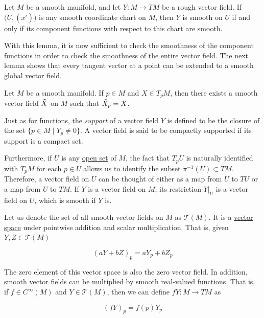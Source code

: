 \documentclass{article}
\newcounter{definition}[section]
\begin{document}
    \begin{lemma}
      \label{thm:smoothness-criterion-for-vector-fields}
      Let $M$ be a smooth manifold, and let $Y: M \to TM$ be a rough vector field. If $\big( U, (x^i)\big)$ is any smooth coordinate chart on $M$, then $Y$ is smooth on $U$ if and only if its component functions with respect to this chart are smooth. 
    \end{lemma}

    With this lemma, it is now sufficient to check the smoothness of the component functions in order to check the smoothness of the entire vector field. The next lemma shows that every tangent vector at a point can be extended to a smooth global vector field. 

    \begin{lemma}
      \label{thm:extending-a-tangent-vector-to-a-global-vector}
      Let $M$ be a smooth manifold. If $p \in M$ and $X \in T_p M$, then there exists a smooth vector field $\Tilde{X}$ on $M$ such that $\Tilde{X}_p = X$. 
    \end{lemma}

    \begin{definition}
      \label{def:support-of-a-vector-field}
      Just as for functions, the \textit{support} of a vector field $Y$ is defined to be the closure of the set $\{ p \in M\;|\; Y_p \neq 0\}$. A vector field is said to be compactly supported if its support is a compact set. 
    \end{definition}

    Furthermore, if $U$ is any \hyperref[pst-def:open-set]{open set} of $M$, the fact that $T_p U$ is naturally identified with $T_p M$ for each $p \in U$ allows us to identify the subset $\pi^{-1} (U) \subset TM$. Therefore, a vector field on $U$ can be thought of either as a map from $U$ to $TU$ or a map from $U$ to $TM$. If $Y$ is a vector field on $M$, its restriction $Y |_U$ is a vector field on $U$, which is smooth if $Y$ is. 

    \begin{definition}
      \label{def:the-space-of-smooth-vector-fields}
      Let us denote the set of all smooth vector fields on $M$ as $\mathcal{T}(M)$. It is a \hyperref[lin-def:vector-space]{vector space} under pointwise addition and scalar multiplication. That is, given $Y, Z \in \mathcal{T}(M)$

        \begin{equation}
          (a Y + b Z)_p = a Y_p + b Z_p
        \end{equation}

      The zero element of this vector space is also the zero vector field. In addition, smooth vector fields can be multiplied by smooth real-valued functions. That is, if $f \in C^\infty (M)$ and $Y \in \mathcal{T}(M)$, then we can define $f Y: M \to TM$ as 

        \begin{equation}
          (fY)_p = f(p) Y_p
        \end{equation}
    \end{definition}
\end{document}
